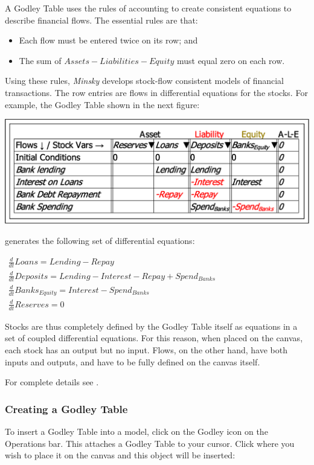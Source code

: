 A Godley Table uses the rules of accounting to create consistent equations
to describe financial flows. The essential rules are that:
\begin{itemize}
\item Each flow must be entered twice on its row; and
\item The sum of $Assets-Liabilities-Equity$ must equal zero on each row.
\end{itemize}
Using these rules, \emph{Minsky} develops stock-flow consistent models
of financial transactions. The row entries are flows in differential
equations for the stocks. For example, the Godley Table shown in the
next figure:

\noindent\includegraphics[width=\textwidth]{images/GodleyTableImages}

generates the following set of differential equations:

$\begin{array}{c}
\frac{d}{dt}Loans=Lending-Repay\\
\frac{d}{dt}Deposits=Lending-Interest-Repay+Spend_{Banks}\\
\frac{d}{dt}Banks_{Equity}=Interest-Spend_{Banks}\\
\frac{d}{dt}Reserves=0
\end{array}$

Stocks are thus completely defined by the Godley Table itself as equations
in a set of coupled differential equations. For this reason, when
placed on the canvas, each stock has an output but no input. Flows,
on the other hand, have both inputs and outputs, and have to be fully
defined on the canvas itself.

For complete details see .

\subsubsection{Creating a Godley Table}

To insert a Godley Table into a model, click on the Godley icon on
the Operations bar. This attaches a Godley Table to your cursor. Click
where you wish to place it on the canvas and this object will be inserted:

